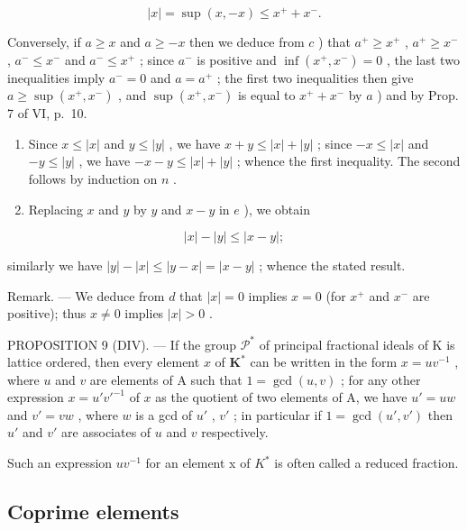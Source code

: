 \[
\left| x \right| = \sup (x, - x) \leqslant x ^ {+} + x ^ {-}.
\]

Conversely, if \(a \geqslant x\) and \(a \geqslant -x\) then we deduce from \(c\) ) that \(a^+ \geqslant x^+\) , \(a^+ \geqslant x^-\) , \(a^- \leqslant x^-\) and \(a^- \leqslant x^+\) ; since \(a^-\) is positive and \(\inf(x^+, x^-) = 0\) , the last two inequalities imply \(a^- = 0\) and \(a = a^+\) ; the first two inequalities then give \(a \geqslant \sup(x^+, x^-)\) , and \(\sup(x^+, x^-)\) is equal to \(x^+ + x^-\) by \(a\) ) and by Prop. 7 of VI, p.~10.

\begin{enumerate}
\def\labelenumi{\alph{enumi})}
\setcounter{enumi}{4}
\item
  Since \(x \leqslant |x|\) and \(y \leqslant |y|\) , we have \(x + y \leqslant |x| + |y|\) ; since \(-x \leqslant |x|\) and \(-y \leqslant |y|\) , we have \(-x - y \leqslant |x| + |y|\) ; whence the first inequality. The second follows by induction on \(n\) .
\item
  Replacing \(x\) and \(y\) by \(y\) and \(x - y\) in \(e\) ), we obtain
\end{enumerate}

\[
\left| x \right| - \left| y \right| \leqslant \left| x - y \right|;
\]

similarly we have \(|y| - |x| \leqslant |y - x| = |x - y|\) ; whence the stated result.

Remark. --- We deduce from \(d\) that \(|x|=0\) implies \(x=0\) (for \(x^{+}\) and \(x^{-}\) are positive); thus \(x\neq0\) implies \(|x|>0\) .

PROPOSITION 9 (DIV). --- If the group \(\mathcal{P}^*\) of principal fractional ideals of K is lattice ordered, then every element \(x\) of \(\mathbf{K}^*\) can be written in the form \(x = uv^{-1}\) , where \(u\) and \(v\) are elements of A such that \(1 = \gcd(u, v)\) ; for any other expression \(x = u'v'^{-1}\) of \(x\) as the quotient of two elements of A, we have \(u' = uw\) and \(v' = vw\) , where \(w\) is a gcd of \(u'\) , \(v'\) ; in particular if \(1 = \gcd(u', v')\) then \(u'\) and \(v'\) are associates of \(u\) and \(v\) respectively.

Such an expression \(uv^{-1}\) for an element x of \(K^{*}\) is often called a reduced fraction.

\subsection{Coprime elements}

